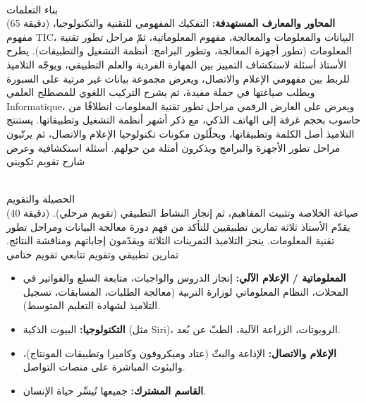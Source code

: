 \documentclass[11pt, a4paper]{article}
\begin{document}
\stagecontent
  {\\[2pt] بناء التعلمات\\\footnotesize (65 دقيقة)}
  {\textbf{المحاور والمعارف المستهدفة:}\newline
   التفكيك المفهومي للتقنية والتكنولوجيا، مفهوم TIC، البيانات والمعلومات والمعالجة، مفهوم المعلوماتية، ثمّ مراحل تطور تقنية المعلومات (تطور أجهزة المعالجة، وتطور البرامج: أنظمة التشغيل والتطبيقات).}
  {يطرح الأستاذ أسئلة لاستكشاف التمييز بين المهارة الفردية والعلم التطبيقي، ويوجّه التلاميذ للربط بين مفهومي الإعلام والاتصال، ويعرض مجموعة بيانات غير مرتبة على السبورة ويطلب صياغتها في جملة مفيدة، ثم يشرح التركيب اللغوي للمصطلح العلمي Informatique، ويعرض على العارض الرقمي مراحل تطور تقنية المعلومات انطلاقًا من حاسوب بحجم غرفة إلى الهاتف الذكي، مع ذكر أشهر أنظمة التشغيل وتطبيقاتها.}
  {يستنتج التلاميذ أصل الكلمة وتطبيقاتها، ويحلّلون مكونات تكنولوجيا الإعلام والاتصال، ثم يرتّبون مراحل تطور الأجهزة والبرامج ويذكرون أمثلة من حولهم.}
  {أسئلة استكشافية وعرض شارح}
  {تقويم تكويني}

\stagecontent
  {\\[2pt] الحصيلة والتقويم\\\footnotesize (40 دقيقة)}
  {صياغة الخلاصة وتثبيت المفاهيم، ثم إنجاز النشاط التطبيقي (تقويم مرحلي).}
  {يقدّم الأستاذ ثلاثة تمارين تطبيقيين للتأكد من فهم دورة معالجة البيانات ومراحل تطور تقنية المعلومات.}
  {ينجز التلاميذ التمرينات الثلاثة ويقدّمون إجاباتهم ومناقشة النتائج.}
  {تمارين تطبيقي وتقويم تتابعي}
  {تقويم ختامي}


\begin{rememberbox}
  \begin{itemize}[label=\textbullet, leftmargin=1.1em, itemsep=2pt, topsep=1pt, parsep=0pt]
    \item \textbf{المعلوماتية / الإعلام الآلي:} إنجاز الدروس والواجبات، متابعة السلع والفواتير في المحلات، النظام المعلوماتي لوزارة التربية (معالجة الطلبات، المسابقات، تسجيل التلاميذ لشهادة التعليم المتوسط).
    \item \textbf{التكنولوجيا:} البيوت الذكية (مثل Siri)، الروبوتات، الزراعة الآلية، الطبّ عن بُعد.
    \item \textbf{الإعلام والاتصال:} الإذاعة والبثّ (عتاد وميكروفون وكاميرا وتطبيقات المونتاج)، والبثوث المباشرة على منصات التواصل.
    \item \textbf{القاسم المشترك:} جميعها تُيسِّر حياة الإنسان.
  \end{itemize}
\end{rememberbox}
\end{document}
